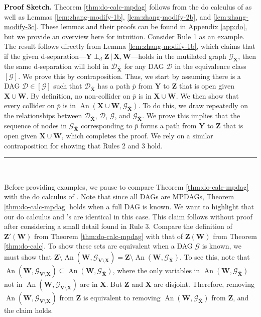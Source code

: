 \documentclass[11pt]{article}
\DeclareMathOperator{\An}{An}
\newcommand{\BlackBox}{\rule{1.5ex}{1.5ex}}  %
\newcommand{\mb}[1]{\mathbf{#1}}
\newcommand{\dsepp}{\perp_{d}}
\newcommand{\g}[1][G]{\mathcal{#1}}
\newenvironment{proofsketch}{\noindent \textbf{Proof Sketch.}}{\hfill\BlackBox\\}
\begin{document}
\begin{proofsketch}
    Theorem \ref{thm:do-calc-mpdag} follows from the do calculus of \cite{pearl2009causality} as well as Lemmas \ref{lem:zhang-modify-1b}, \ref{lem:zhang-modify-2b}, and \ref{lem:zhang-modify-3c}. These lemmas and their proofs can be found in Appendix \ref{app:do}, but we provide an overview here for intuition. Consider Rule 1 as an example. The result follows directly from Lemma \ref{lem:zhang-modify-1b}, which claims that if the given d-separation---$\mb{Y} \dsepp \mb{Z} \,|\, \mb{X}, \mb{W}$---holds in the mutilated graph $\g_{\overline{\mb{X}}}$, then the same d-separation will hold in $\g[D]_{\overline{\mb{X}}}$ for any DAG $\g[D]$ in the equivalence class $[\g]$. We prove this by contraposition. Thus, we start by assuming there is a DAG $\g[D] \in [\g]$ such that $\g[D]_{\overline{\mb{X}}}$ has a path $\overline{p}$ from $\mb{Y}$ to $\mb{Z}$ that is open given $\mb{X} \cup \mb{W}$. By definition, no non-collider on $\overline{p}$ is in $\mb{X} \cup \mb{W}$. We then show that every collider on $\overline{p}$ is in $\An( \mb{X} \cup \mb{W}, \g_{\overline{\mb{X}}} )$. To do this, we draw repeatedly on the relationships between $\g[D]_{\overline{\mb{X}}}$, $\g[D]$, $\g$, and $\g_{\overline{\mb{X}}}$. We prove this implies that the sequence of nodes in $\g_{\overline{\mb{X}}}$ corresponding to $\overline{p}$ forms a path from $\mb{Y}$ to $\mb{Z}$ that is open given $\mb{X} \cup \mb{W}$, which completes the proof. We rely on a similar contraposition for showing that Rules 2 and 3 hold.
\end{proofsketch}


Before providing examples, we pause to compare Theorem \ref{thm:do-calc-mpdag} with the do calculus of \cite{pearl2009causality}. Note that since all DAGs are MPDAGs, Theorem \ref{thm:do-calc-mpdag} holds when a full DAG is known. We want to highlight that our do calculus and \citeauthor{pearl2009causality}'s are identical in this case. This claim follows without proof after considering a small detail found in Rule 3. Compare the definition of $\mb{Z'(W)}$ from Theorem \ref{thm:do-calc-mpdag} with that of $\mb{Z(W)}$ from Theorem \ref{thm:do-calc}. To show these sets are equivalent when a DAG $\g$ is known, we must show that $\mb{Z} \setminus \An(\mb{W}, \g_{\mb{V} \setminus \mb{X}}) = \mb{Z} \setminus \An(\mb{W}, \g_{\overline{\mb{X}}})$. To see this, note that $\An(\mb{W}, \g_{\mb{V} \setminus \mb{X}}) \subseteq \An(\mb{W}, \g_{\overline{\mb{X}}})$, where the only variables in $\An(\mb{W}, \g_{\overline{\mb{X}}})$ not in $\An(\mb{W}, \g_{\mb{V} \setminus \mb{X}})$ are in $\mb{X}$. But $\mb{Z}$ and $\mb{X}$ are disjoint. Therefore, removing $\An(\mb{W}, \g_{\mb{V} \setminus \mb{X}})$ from $\mb{Z}$ is equivalent to removing $\An(\mb{W}, \g_{\overline{\mb{X}}})$ from $\mb{Z}$, and the claim holds.
\end{document}
